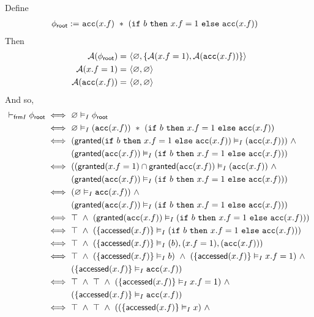 Define
\begin{align*}
{\phi_\textsf{root}} := & \
\texttt{acc}(x.f) \ \ast \
(\texttt{if} \ b \ \texttt{then} \ x.f = 1 \ \texttt{else} \ \texttt{acc}(x.f))
\end{align*}
Then
\begin{align*}
\mathcal{A}({\phi_\textsf{root}}) = & \
\langle \varnothing, \left\{  \mathcal{A}(x.f = 1), \mathcal{A}(\texttt{acc}(x.f))  \right\} \rangle \\
\mathcal{A}(x.f = 1) = & \ \langle \varnothing, \varnothing \rangle \\
\mathcal{A}(\texttt{acc}(x.f)) = & \ \langle \varnothing, \varnothing \rangle
\end{align*}
And so,
\begin{align*}
\selfframing \phiroot \iff & \
\empty \frames \phiroot
\\ \iff & \
\empty \frames (\cacc(x.f)) \ \ast \ (\cif \ b \ \cthen \ x.f = 1 \ \celse \ \cacc(x.f))
\\ \iff & \
( \granted(\cif \ b \ \cthen \ x.f = 1 \ \celse \ \cacc(x.f)) \frames (\cacc(x.f)) ) \ \land \\ & \
( \granted(\cacc(x.f)) \frames (\cif \ b \ \cthen \ x.f = 1 \ \celse \ \cacc(x.f)) )
\\ \iff & \
( ( \granted(x.f=1) \cap \granted(\cacc(x.f) ) \frames ( \cacc(x.f) ) \ \land \\ & \
( \granted(\cacc(x.f)) \frames (\cif \ b \ \cthen \ x.f = 1 \ \celse \ \cacc(x.f)) )
\\ \iff & \
( \empty \frames \cacc(x.f) ) \ \land \\ & \
( \granted(\cacc(x.f)) \frames (\cif \ b \ \cthen \ x.f = 1 \ \celse \ \cacc(x.f)) )
\\ \iff & \
\top \ \land \
( \granted(\cacc(x.f)) \frames (\cif \ b \ \cthen \ x.f = 1 \ \celse \ \cacc(x.f)) )
\\ \iff & \
\top \ \land \
( \set{ \accessed(x.f) } \frames (\cif \ b \ \cthen \ x.f = 1 \ \celse \ \cacc(x.f)) )
\\ \iff & \
\top \ \land \
( \set{ \accessed(x.f) } \frames (b), (x.f=1), (\cacc(x.f)) )
\\ \iff & \
\top \ \land \
(\set{ \accessed(x.f) } \frames b) \ \land \
(\set{ \accessed(x.f) } \frames x.f=1) \ \land \\ & \
(\set{ \accessed(x.f) } \frames \cacc(x.f))
\\ \iff & \
\top \ \land \
\top \ \land \
(\set{ \accessed(x.f) } \frames x.f=1) \ \land \\ & \
(\set{ \accessed(x.f) } \frames \cacc(x.f))
\\ \iff & \
\top \ \land \ \top \ \land \
((\set{ \accessed(x.f) } \frames x) \ \land \

\end{align*}
